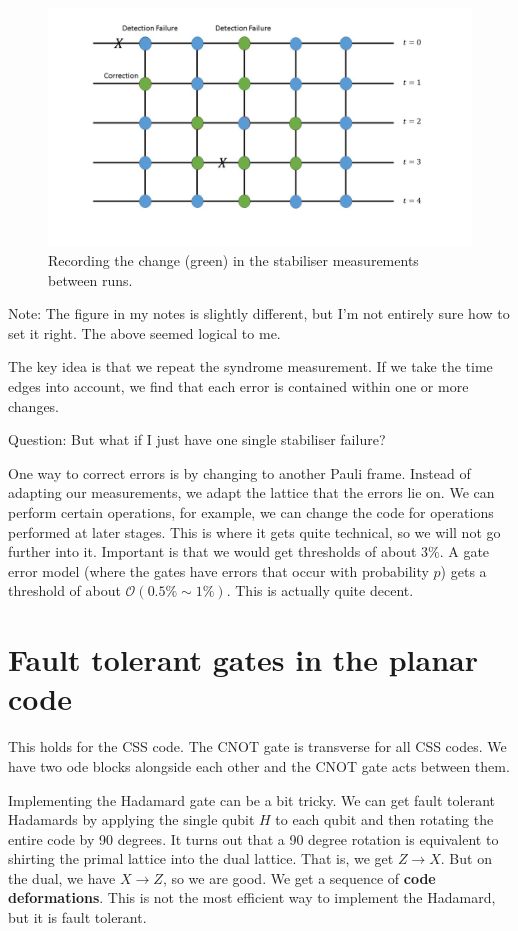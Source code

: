 \begin{figure}[h]
\centering
\includegraphics[width = \textwidth] {./TimeCorrection.jpg}
\caption{Recording the change (green) in the stabiliser measurements between runs.}
\end{figure}

Note: The figure in my notes is slightly different, but I'm not entirely sure how to set it right. The above seemed logical to me. 

The key idea is that we repeat the syndrome measurement. If we take the time edges into account, we find that each error is contained within one or more changes. 

Question: But what if I just have one single stabiliser failure? 

One way to correct errors is by changing to another Pauli frame. Instead of adapting our measurements, we adapt the lattice that the errors lie on. We can perform certain operations, for example, we can change the code for operations performed at later stages. This is where it gets quite technical, so we will not go further into it. Important is that we would get thresholds of about $3\%$. A gate error model (where the gates have errors that occur with probability $p$) gets a threshold of about $\mathcal{O}(0.5\% \sim 1 \%)$. This is actually quite decent. 

\section{Fault tolerant gates in the planar code}
This holds for the CSS code. The CNOT gate is transverse for all CSS codes. We have two ode blocks alongside each other and the CNOT gate acts between them. 

Implementing the Hadamard gate can be a bit tricky. We can get fault tolerant Hadamards by applying the single qubit  $H$ to each qubit and then rotating the entire code by 90 degrees. It turns out that a 90 degree rotation is equivalent to shirting the primal lattice into the dual lattice. That is, we get $Z \rightarrow X$. But on the dual, we have $X \rightarrow Z$, so we are good. We get a sequence of \textbf{code deformations}. This is not the most efficient way to implement the Hadamard, but it is fault tolerant. 

